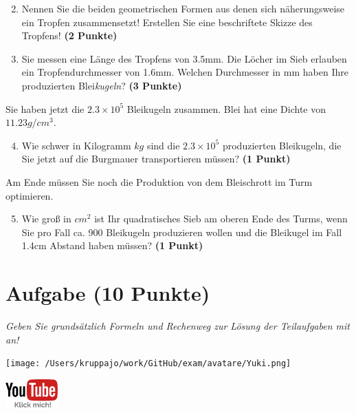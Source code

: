 \documentclass[a4paper, 9pt]{scrartcl}\usepackage[]{graphicx}\usepackage[]{xcolor}
\begin{document}
\begin{enumerate}
  \setcounter{enumi}{1}
\item Nennen Sie die beiden geometrischen Formen aus denen sich näherungsweise ein Tropfen zusammensetzt! Erstellen Sie eine beschriftete Skizze des Tropfens! \textbf{(2 Punkte)}
\item Sie messen eine Länge des Tropfens von 3.5mm. Die Löcher im Sieb erlauben ein Tropfendurchmesser von 1.6mm. Welchen Durchmesser in mm haben Ihre produzierten Blei\textit{kugeln}?  \textbf{(3 Punkte)}
\end{enumerate}

Sie haben jetzt die \ensuremath{2.3\times 10^{5}} Bleikugeln zusammen. Blei hat eine Dichte
von $11.23g/cm^3$.

\begin{enumerate}
  \setcounter{enumi}{3}
\item Wie schwer in Kilogramm $kg$ sind die \ensuremath{2.3\times 10^{5}} produzierten
  Bleikugeln, die Sie jetzt auf die Burgmauer transportieren müssen?
  \textbf{(1 Punkt)}
\end{enumerate}

Am Ende müssen Sie noch die Produktion von dem Bleischrott im Turm optimieren.

\begin{enumerate}
  \setcounter{enumi}{4}
\item Wie gro{\ss} in $cm^2$ ist Ihr quadratisches Sieb am oberen Ende des Turms,
  wenn Sie pro Fall ca. 900 Bleikugeln produzieren wollen und
  die Bleikugel im Fall 1.4cm Abstand haben müssen?  \textbf{(1
    Punkt)}
\end{enumerate}
 
\clearpage

\section{Aufgabe \hfill (10 Punkte)}

\textit{Geben Sie grundsätzlich Formeln und Rechenweg zur Lösung der Teilaufgaben mit an!} \\[1Ex]
 

 
\begin{minipage}[t]{0.5\textwidth}
\texttt{[image: /Users/kruppajo/work/GitHub/exam/avatare/Yuki.png]}
\end{minipage}
\begin{minipage}[t]{0.5\textwidth}
\hfill
\href{https://youtu.be/Mr6eslls4J0}{\includegraphics[width = 2cm]{img/youtube}}
\end{minipage}
\end{document}
